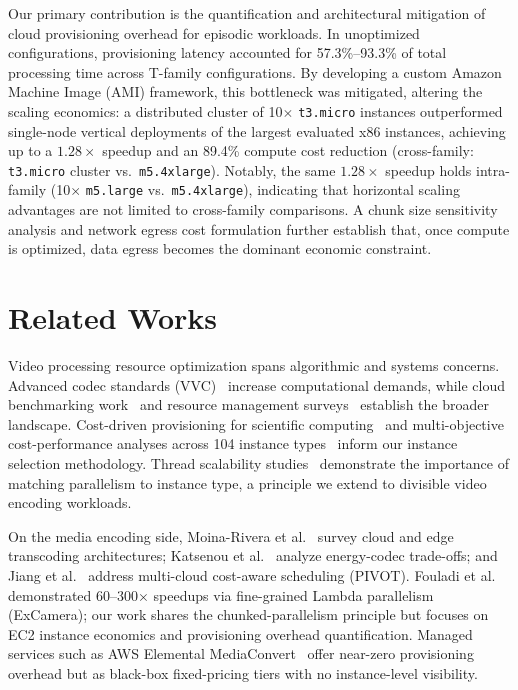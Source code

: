 \documentclass[conference]{IEEEtran}
\begin{document}
Our primary contribution is the quantification and architectural mitigation of cloud provisioning overhead for episodic workloads. In unoptimized configurations, provisioning latency accounted for 57.3\%--93.3\% of total processing time across T-family configurations. By developing a custom Amazon Machine Image (AMI) framework, this bottleneck was mitigated, altering the scaling economics: a distributed cluster of 10$\times$ \texttt{t3.micro} instances outperformed single-node vertical deployments of the largest evaluated x86 instances, achieving up to a $1.28\times$ speedup and an 89.4\% compute cost reduction (cross-family: \texttt{t3.micro} cluster vs.\ \texttt{m5.4xlarge}). Notably, the same $1.28\times$ speedup holds intra-family (10$\times$ \texttt{m5.large} vs.\ \texttt{m5.4xlarge}), indicating that horizontal scaling advantages are not limited to cross-family comparisons. A chunk size sensitivity analysis and network egress cost formulation further establish that, once compute is optimized, data egress becomes the dominant economic constraint.

\section{Related Works}
\label{rel_works}

Video processing resource optimization spans algorithmic and systems concerns. Advanced codec standards (VVC)~\cite{b15,b16} increase computational demands, while cloud benchmarking work~\cite{b3} and resource management surveys~\cite{b4} establish the broader landscape. Cost-driven provisioning for scientific computing~\cite{b2} and multi-objective cost-performance analyses across 104 instance types~\cite{b1} inform our instance selection methodology. Thread scalability studies~\cite{b23} demonstrate the importance of matching parallelism to instance type, a principle we extend to divisible video encoding workloads.

On the media encoding side, Moina-Rivera et al.~\cite{b22} survey cloud and edge transcoding architectures; Katsenou et al.~\cite{b8} analyze energy-codec trade-offs; and Jiang et al.~\cite{b20} address multi-cloud cost-aware scheduling (PIVOT). Fouladi et al.~\cite{excamera} demonstrated 60--300$\times$ speedups via fine-grained Lambda parallelism (ExCamera); our work shares the chunked-parallelism principle but focuses on EC2 instance economics and provisioning overhead quantification. Managed services such as AWS Elemental MediaConvert~\cite{awsmediaconvert} offer near-zero provisioning overhead but as black-box fixed-pricing tiers with no instance-level visibility.
\end{document}
